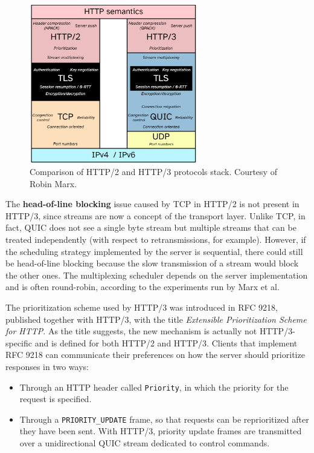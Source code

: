 \begin{figure}
    \centering
    \includegraphics[width=0.65\textwidth]{res/protocol-stack-h2-h3-improved-readability.png}
    \caption{Comparison of HTTP/2 and HTTP/3 protocols stack. Courtesy of Robin Marx.\protect\footnotemark}
    \label{fig:my_label}
\end{figure}


The \textbf{head-of-line blocking} issue caused by TCP in HTTP/2 is not present in HTTP/3, since streams are now a concept of the transport layer. Unlike TCP, in fact, QUIC does not see a single byte stream but multiple streams that can be treated independently (with respect to retransmissions, for example). However, if the scheduling strategy implemented by the server is sequential, there could still be head-of-line blocking because the slow transmission of a stream would block the other ones. The multiplexing scheduler depends on the server implementation and is often round-robin, according to the experiments run by Marx et al.\cite{quicdiversity}

The prioritization scheme used by HTTP/3 was introduced in RFC 9218, published together with HTTP/3, with the title \textit{Extensible Prioritization Scheme for HTTP}. As the title suggests, the new mechanism is actually not HTTP/3-specific and is defined for both HTTP/2 and HTTP/3. Clients that implement RFC 9218 can communicate their preferences on how the server should prioritize responses in two ways:\cite{rfc9218}

\begin{itemize}
    \item Through an HTTP header called \texttt{Priority}, in which the priority for the request is specified.
    \item Through a \texttt{PRIORITY\_UPDATE} frame, so that requests can be reprioritized after they have been sent. With HTTP/3, priority update frames are transmitted over a unidirectional QUIC stream dedicated to control commands.
\end{itemize}

